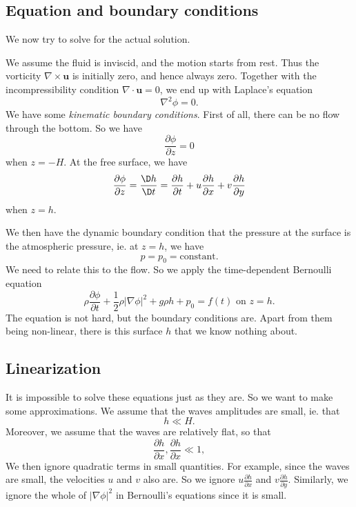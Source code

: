 \documentclass[a4paper]{article}
\begin{document}
\subsection{Equation and boundary conditions}
We now try to solve for the actual solution.
\begin{center}
\end{center}
We assume the fluid is inviscid, and the motion starts from rest. Thus the vorticity $\nabla \times \mathbf{u}$ is initially zero, and hence always zero. Together with the incompressibility condition $\nabla \cdot \mathbf{u} = 0$, we end up with Laplace's equation
\[
  \nabla^2 \phi = 0.
\]
We have some \emph{kinematic boundary conditions}. First of all, there can be no flow through the bottom. So we have
\[
  \frac{\partial \phi}{\partial z} = 0
\]
when $z = -H$. At the free surface, we have
\[
  \frac{\partial \phi}{\partial z} = \frac{\D h}{\D t} = \frac{\partial h}{\partial t} + u \frac{\partial h}{\partial x} + v \frac{\partial h}{\partial y}
\]
when $z = h$.

We then have the dynamic boundary condition that the pressure at the surface is the atmospheric pressure, ie. at $z = h$, we have
\[
  p = p_0 = \text{constant}.
\]
We need to relate this to the flow. So we apply the time-dependent Bernoulli equation
\[
  \rho \frac{\partial \phi}{\partial t} + \frac{1}{2} \rho|\nabla \phi|^2 + g\rho h + p_0 = f(t)\text{ on }z = h.
\]
The equation is not hard, but the boundary conditions are. Apart from them being non-linear, there is this surface $h$ that we know nothing about.

\subsection{Linearization}
It is impossible to solve these equations just as they are. So we want to make some approximations. We assume that the waves amplitudes are small, ie. that
\[
  h \ll H.
\]
Moreover, we assume that the waves are relatively flat, so that
\[
  \frac{\partial h}{\partial x},\frac{\partial h}{\partial x} \ll 1,
\]
We then ignore quadratic terms in small quantities. For example, since the waves are small, the velocities $u$ and $v$ also are. So we ignore $u \frac{\partial h}{\partial x}$ and $v\frac{\partial h}{\partial y}$. Similarly, we ignore the whole of $|\nabla \phi|^2$ in Bernoulli's equations since it is small.
\end{document}
